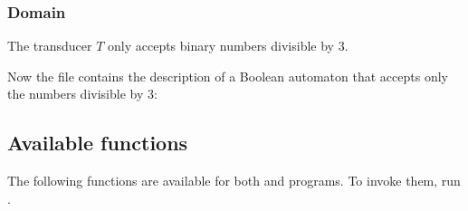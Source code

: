 \subsubsection{Domain}
The transducer $T$ only accepts binary numbers divisible by 3.


Now the file  contains the description of a
Boolean automaton that accepts only the numbers divisible by 3:




\subsection{Available functions}
The following functions are available for both 
and  programs.  To invoke them, run
.


